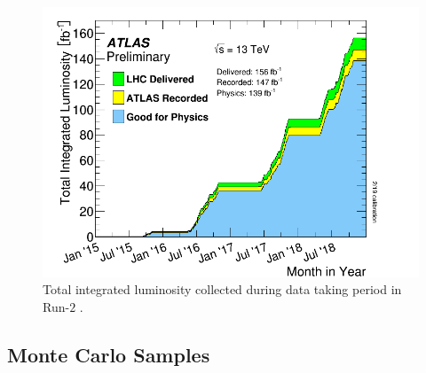 \begin{figure}[!htbp]
\centering
\includegraphics[width=.8\linewidth]{figures/AnalysisOverview/IntegratedLumiRun2.pdf}  
  \caption{Total integrated luminosity collected during data taking period in Run-$2$ \cite{ATLASRun2DataTaking}. }
\label{fig:InstLuminosity}
\end{figure}

\subsection{Monte Carlo Samples }
\label{subsec:MCSamples}

